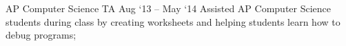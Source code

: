 \experience
    {AP Computer Science}
    {TA}
    {Aug `13 -- May `14}
    {
        Assisted AP Computer Science students during class by creating worksheets and helping
        students learn how to debug programs;
    }
